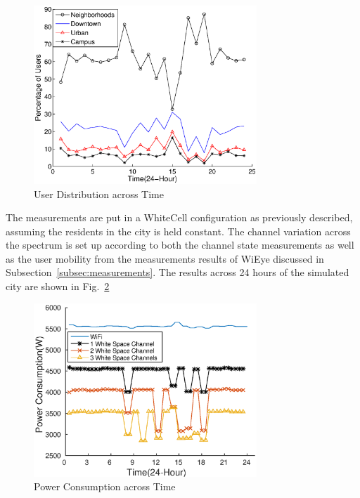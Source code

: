\begin{figure}
\vspace{-0.0in}
\centering
\includegraphics[width=84mm]{figures/wieyeprocess}
\vspace{-0.1in}
\caption{User Distribution across Time}
\label{fig:wieyeprocess}
\vspace{-0.1in}
\end{figure}

The measurements are put in a WhiteCell configuration as previously described, assuming the residents in the city is held constant. 
The channel variation across the spectrum is set up according to both the channel state measurements as well as the user mobility from the measurements results of WiEye discussed in 
Subsection~\ref{subsec:measurements}. The results across 24 hours of the simulated city 
are shown in Fig.~\ref{fig:timevary}

\begin{figure}[hpt]
\vspace{-0.0in}
\centering
\includegraphics[width=84mm]{figures/timevary}
\vspace{-0.1in}
\caption{Power Consumption across Time}
\label{fig:timevary}
\vspace{-0.1in}
\end{figure}

